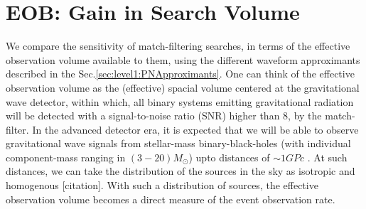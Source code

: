 \documentclass[aps,
prd,
amsmath,
amssymb,
twocolumn,
floatfix,
groupedaddress]{revtex4-1}
\begin{document}
\section{EOB: Gain in Search Volume}\label{sec:level1:SearchVolume}
We compare the sensitivity of match-filtering searches, in terms of the effective observation volume available to them, using the different waveform approximants described in the Sec.\ref{sec:level1:PNApproximants}. One can think of the effective observation volume as the (effective) spacial volume centered at the gravitational wave detector, within which, all binary systems emitting gravitational radiation will be detected with a signal-to-noise ratio (SNR) higher than $8$, by the match-filter. In the advanced detector era, it is expected that we will be able to observe gravitational wave signals from stellar-mass binary-black-holes (with individual component-mass ranging in $(3-20)M_{\odot}$) upto distances of $\sim1GPc$ \citep{LSCCBCRates2010}. At such distances, we can take the distribution of the sources in the sky as isotropic and homogenous [citation]. With such a distribution of sources, the effective observation volume becomes a direct measure of the event observation rate.
\end{document}
